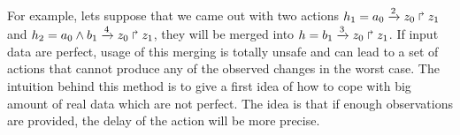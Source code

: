 For example, lets suppose that we came out with two actions $h_1=a_0\xrightarrow{2} z_0 \Rsh z_1$ and $h_2=a_0 \wedge b_1 \xrightarrow{4} z_0 \Rsh z_1$, they will be merged into $h=b_1\xrightarrow{3} z_0 \Rsh z_1$.
If input data are perfect, usage of this merging is totally unsafe and can lead to a set of actions that cannot produce any of the observed changes in the worst case.
The intuition behind this method is to give a first idea of how to cope with big amount of real data which are not perfect.
The idea is that if enough observations are provided, the delay of the action will be more precise.
